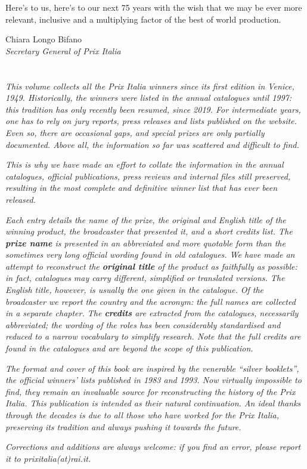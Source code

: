 Here's to us, here's to our next 75 years with the wish that we may be ever more relevant, inclusive and a multiplying factor of the best of world production.
\par\bigskip\par
\noindent Chiara Longo Bifano\\
\noindent\textit{Secretary General of Prix Italia}\\
\pagebreak\\
\vspace{120pt}\\
\textsl{This volume collects all the Prix Italia winners since its first edition in Venice, 1949. Historically, the winners were listed in the annual catalogues until 1997: this tradition has only recently been resumed, since 2019. For intermediate years, one has to rely on jury reports, press releases and lists published on the website. Even so, there are occasional gaps, and special prizes are only partially documented. Above all, the information so far was scattered and difficult to find.}

\textsl{This is why we have made an effort to collate the information in the annual catalogues, official publications, press reviews and internal files still preserved, resulting in the most complete and definitive winner list that has ever been released.}

\bigskip

\noindent\textsl{Each entry details the name of the prize, the original and English title of the winning product, the broadcaster that presented it, and a short credits list. The \textbf{prize name} is presented in an abbreviated and more quotable form than the sometimes very long official wording found in old catalogues. We have made an attempt to reconstruct the \textbf{original title} of the product as faithfully as possible: in fact, catalogues may carry different, simplified or translated versions. The English title, however, is usually the one given in the catalogue. Of the broadcaster we report the country and the acronym: the full names are collected in a separate chapter. The \textbf{credits} are extracted from the catalogues, necessarily abbreviated; the wording of the roles has been considerably standardised and reduced to a narrow vocabulary to simplify research. Note that the full credits are found in the catalogues and are beyond the scope of this publication.}

\bigskip

\noindent\textsl{The format and cover of this book are inspired by the venerable ``silver booklets'', the official winners' lists published in 1983 and 1993. Now virtually impossible to find, they remain an invaluable source for reconstructing the history of the Prix Italia. This publication is intended as their natural continuation. An ideal thanks through the decades is due to all those who have worked for the Prix Italia, preserving its tradition and always pushing it towards the future.}

\bigskip\textsl{Corrections and additions are always welcome: if you find an error, please report it to prixitalia(at)rai.it.}

